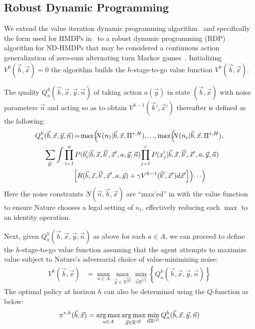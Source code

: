  
\subsection{Robust Dynamic Programming}

We extend the value iteration dynamic programming
algorithm~\cite{bellman} and specifically the form used for HMDPs
in~\cite{sdp_aaai} to a robust dynamic programming (RDP) algorithm for
ND-HMDPs that may be considered a continuous action generalization of
zero-sum alternating turn Markov games~\cite{littman94}.  Initializing
$V^0(\vec{b},\vec{x}) = 0$ the algorithm builds the $h$-stage-to-go
value function $V^h(\vec{b},\vec{x})$.

The quality $Q_a^{h}(\vec{b},\vec{x},\vec{y},\vec{n})$ of taking
action $a(\vec{y})$ in state $(\vec{b},\vec{x})$ with noise parameters
$\vec{n}$ and acting so as to obtain $V^{h-1}(\vec{b}',\vec{x}')$ thereafter 
is defined as the following:
{\footnotesize
\begin{align}
Q_a^{h}&(\vec{b},\vec{x},\vec{y},\vec{n}) \! = \!
\max\!\Big(\!\!N(n_1|\vec{b},\vec{x},\Pi^{*,H}),\!\ldots\!, \max\!\Big(\!\!N(n_e|\vec{b},\vec{x},\Pi^{*,H}), \nonumber \\
& 
\sum_{\vec{b}'} \int \prod_{i=1}^a P(b_i'|\vec{b},\vec{x},\vec{b}',\vec{x}',a,\vec{y},\vec{n}) \!
\prod_{j=1}^c P(x_j'|\vec{b},\vec{x},\vec{b}',\vec{x}',a,\vec{y},\vec{n}) \! \nonumber \\
& \qquad \qquad \; \Big[ R(\vec{b},\vec{x},\vec{b}',\vec{x}',a,\vec{y}) + \gamma V^{h-1}(\vec{b}',\vec{x}') d\vec{x}' \Big] \Big) \! \cdots \! \Big) \hspace{-2mm} \label{eq:qfun}
\end{align}}
Here the noise constraints $N(\vec{n},\vec{b},\vec{x})$ are ``max'ed''
in with the value function to ensure Nature chooses a legal setting 
of $n_l$, effectively reducing each $\max$ to an identity operation.  

Next, given $Q_a^h(\vec{b},\vec{x},\vec{y},\vec{n})$ as above for each
$a \in A$, we can proceed to define the $h$-stage-to-go value function
assuming that the agent attempts to maximize value subject to Nature's
adversarial choice of value-minimizing noise:
{\footnotesize
\begin{align}
V^{h}(\vec{b},\vec{x}) & = \max_{a \in A} \max_{\vec{y} \in \mathbb{R}^{|\vec{y}|}} \min_{\vec{n} \mathbb{R}^{|\vec{e}|}} \left\{ Q^{h}_a(\vec{b},\vec{x},\vec{y},\vec{n}) \right\} \label{eq:vfun}
\end{align}}
The optimal policy at horizon $h$ can also be determined using the
$Q$-function as below:
{\footnotesize
\begin{align}
\pi^{*,h}(\vec{b},\vec{x}) = \argmax_{a \in A}  \argmax_{\vec{y} \in \mathbb{R}^{|\vec{y}|}}  \min_{\vec{n} \mathbb{R}^{|\vec{e}|}}  Q^h_a(\vec{b},\vec{x},\vec{y},\vec{n})
\end{align}}

